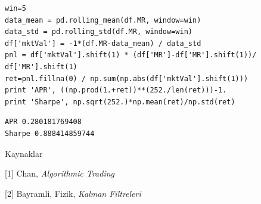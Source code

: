 \documentclass[12pt,fleqn]{article}\usepackage{../../common}
\begin{document}
\begin{verbatim}
win=5
data_mean = pd.rolling_mean(df.MR, window=win)
data_std = pd.rolling_std(df.MR, window=win)
df['mktVal'] = -1*(df.MR-data_mean) / data_std
pnl = df['mktVal'].shift(1) * (df['MR']-df['MR'].shift(1))/ df['MR'].shift(1)
ret=pnl.fillna(0) / np.sum(np.abs(df['mktVal'].shift(1)))
print 'APR', ((np.prod(1.+ret))**(252./len(ret)))-1.
print 'Sharpe', np.sqrt(252.)*np.mean(ret)/np.std(ret)
\end{verbatim}

\begin{verbatim}
APR 0.280181769408
Sharpe 0.888414859744
\end{verbatim}


Kaynaklar

[1] Chan, {\em Algorithmic Trading}

[2] Bayramli, Fizik, {\em Kalman Filtreleri}
\end{document}

